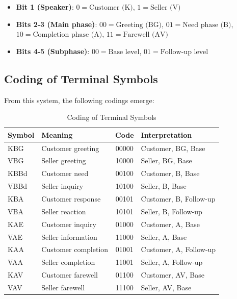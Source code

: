 \documentclass[
  12pt,
  a4paper,
  oneside,
  titlepage
]{article}
\begin{document}
\begin{itemize}
    \item \textbf{Bit 1 (Speaker)}: 
    \(0 = \text{Customer (K)}\), \(1 = \text{Seller (V)}\)
    
    \item \textbf{Bits 2-3 (Main phase)}:
    \(00 = \text{Greeting (BG)}\),
    \(01 = \text{Need phase (B)}\),
    \(10 = \text{Completion phase (A)}\),
    \(11 = \text{Farewell (AV)}\)
    
    \item \textbf{Bits 4-5 (Subphase)}:
    \(00 = \text{Base level}\),
    \(01 = \text{Follow-up level}\)
\end{itemize}

\subsection{Coding of Terminal Symbols}

From this system, the following codings emerge:

\begin{table}[h]
\centering
\caption{Coding of Terminal Symbols}
\label{tab:coding}
\begin{tabular}{@{} l l c l @{}}
\toprule
\textbf{Symbol} & \textbf{Meaning} & \textbf{Code} & \textbf{Interpretation} \\
\midrule
KBG & Customer greeting & 00000 & Customer, BG, Base \\
VBG & Seller greeting & 10000 & Seller, BG, Base \\
KBBd & Customer need & 00100 & Customer, B, Base \\
VBBd & Seller inquiry & 10100 & Seller, B, Base \\
KBA & Customer response & 00101 & Customer, B, Follow-up \\
VBA & Seller reaction & 10101 & Seller, B, Follow-up \\
KAE & Customer inquiry & 01000 & Customer, A, Base \\
VAE & Seller information & 11000 & Seller, A, Base \\
KAA & Customer completion & 01001 & Customer, A, Follow-up \\
VAA & Seller completion & 11001 & Seller, A, Follow-up \\
KAV & Customer farewell & 01100 & Customer, AV, Base \\
VAV & Seller farewell & 11100 & Seller, AV, Base \\
\bottomrule
\end{tabular}
\end{table}
\end{document}
